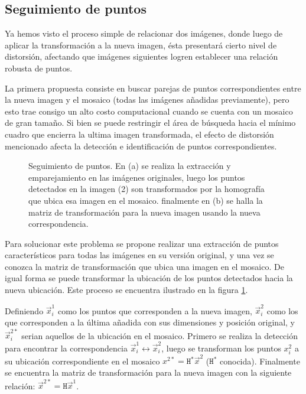 \subsection{Seguimiento de puntos}\label{seguimiento-puntos}

Ya hemos visto el proceso simple de relacionar dos imágenes, donde luego de aplicar la transformación a la nueva imagen, ésta presentará cierto nivel de distorsión, afectando que imágenes siguientes logren establecer una relación robusta de puntos.

La primera propuesta consiste en buscar parejas de puntos correspondientes entre la nueva imagen y el mosaico (todas las imágenes añadidas previamente), pero esto trae consigo un alto costo computacional cuando se cuenta con un mosaico de gran tamaño. Si bien se puede restringir el área de búsqueda hacia el mínimo cuadro que encierra la ultima imagen transformada, el efecto de distorsión mencionado afecta la detección e identificación de puntos correspondientes.

\begin{figure}[h]
	\centering     %
	
	
	\caption[Seguimiento de puntos]{Seguimiento de puntos. En (a) se realiza la extracción y emparejamiento en las imágenes originales, luego los puntos detectados en la imagen (2) son transformados por la homografía que ubica esa imagen en el mosaico. finalmente en (b) se halla la matriz de transformación para la nueva imagen usando la nueva correspondencia.}
	\label{imagen:track}
\end{figure}

Para solucionar este problema se propone realizar una extracción de puntos característicos para todas las imágenes en su versión original, y una vez se conozca la matriz de transformación que ubica una imagen en el mosaico. De igual forma se puede transformar la ubicación de los puntos detectados hacia la nueva ubicación. Este proceso se encuentra ilustrado en la figura \ref{imagen:track}.

Definiendo $\vec{x}^1_i$ como los puntos que corresponden a la nueva imagen, $\vec{x}^2_i$ como los que corresponden a la última añadida con sus dimensiones y posición original, y $\vec{x}^{2*}_i$ serian aquellos de la ubicación en el mosaico. Primero se realiza la detección para encontrar la correspondencia $\vec{x}^1_i \leftrightarrow \vec{x}^2_i$, luego se transforman los puntos $x^2_i$ a su ubicación correspondiente en el mosaico $x^{2*} = \mathtt{H}^*\vec{x}^2$ ($\mathtt{H}^*$ conocida). Finalmente se encuentra la matriz de transformación para la nueva imagen con la siguiente relación: $\vec{x}^{2*} = \mathtt{H}\vec{x}^1$.



